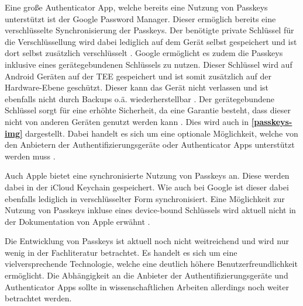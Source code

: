 Eine große Authenticator App, welche bereits eine Nutzung von Passkeys unterstützt ist der Google Password Manager. Dieser ermöglich bereits eine verschlüsselte Synchronisierung der Passkeys. Der benötigte private Schlüssel für die Verschlüssellung wird dabei lediglich auf dem Gerät selbst gespeichert und ist dort selbst zusätzlich verschlüsselt \cite{passkeysgoogle}. Google ermöglicht es zudem die Passkeys inklusive eines gerätegebundenen Schlüssels zu nutzen. Dieser Schlüssel wird auf Android Geräten auf der \ac{TEE} gespeichert und ist somit zusätzlich auf der Hardware-Ebene geschützt. Dieser kann das Gerät nicht verlassen und ist ebenfalls nicht durch Backups o.ä. wiederherstellbar \cite{passkeysgoogle}. Der gerätegebundene Schlüssel sorgt für eine erhöhte Sicherheit, da eine Garantie besteht, dass dieser nicht von anderen Geräten genutzt werden kann \cite{usecasfido}. Dies wird auch in \textbf{\ref{passkeys-img}} dargestellt. Dabei handelt es sich um eine optionale Möglichkeit, welche von den Anbietern der Authentifizierungsgeräte oder Authenticator Apps unterstützt werden muss \cite{usecasfido}.

Auch Apple bietet eine synchronisierte Nutzung von Passkeys an. Diese werden dabei in der iCloud Keychain gespeichert. Wie auch bei Google ist dieser dabei ebenfalls lediglich in verschlüsselter Form synchronisiert. Eine Möglichkeit zur Nutzung von Passkeys inkluse eines device-bound Schlüssels wird aktuell nicht in der Dokumentation von Apple erwähnt \cite{passkeysapple}.

Die Entwicklung von Passkeys ist aktuell noch nicht weitreichend und wird nur wenig in der Fachliteratur betrachtet. Es handelt es sich um eine vielversprechende Technologie, welche eine deutlich höhere Benutzerfreundlichkeit ermöglicht. Die Abhängigkeit an die Anbieter der Authentifizierungsgeräte und Authenticator Apps sollte in wissenschaftlichen Arbeiten allerdings noch weiter betrachtet werden. 







